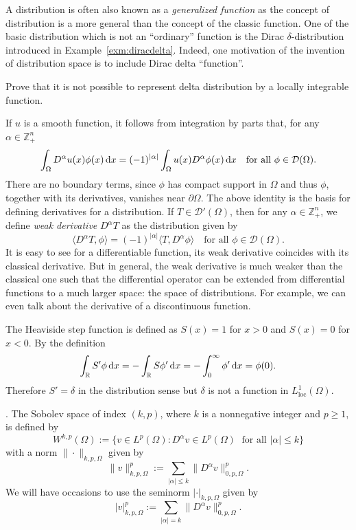 A distribution is often also known as a {\it generalized function} as the concept of distribution
is a more general than the concept of the classic function. One of the basic distribution
which is not an ``ordinary'' function is the Dirac $\delta$-distribution introduced in Example~\ref{exm:diracdelta}. Indeed, one motivation of the invention of distribution space is to include Dirac delta
``function''.

\begin{exe}
Prove that it is not possible to represent delta distribution by a locally integrable
function.
\end{exe}

If $u$ is a smooth function, it follows from integration by parts that, for any $\alpha\in\mathbb Z_+^n$
\[
\int_{\Omega}D^{\alpha}u(x)\phi(x)\,{\rm d}x=(-1)^{|\alpha|}\int_{\Omega}u(x)D^{\alpha}\phi(x)\,{\rm d}x\quad\textrm{for all } \phi\in\mathcal D(\Omega).
\]
There are no boundary terms, since $\phi$ has compact support in $\Omega$
 and thus $\phi$, together with
its derivatives, vanishes near $\partial\Omega$. The above identity is the basis for defining derivatives
for a distribution. If $T\in\mathcal D'(\Omega)$, then for any $\alpha\in\mathbb Z_+^n$, we define {\it weak derivative} $D^{\alpha}T$ as
the distribution given by
\[
\langle D^{\alpha}T, \phi\rangle=(-1)^{|\alpha|}\langle T, D^{\alpha}\phi\rangle\quad\textrm{for all } \phi\in\mathcal D(\Omega).
\]
It is easy to see for a differentiable function, its weak derivative coincides with its classical
derivative. But in general, the weak derivative is much weaker than the classical one such
that the differential operator can be extended from differential functions to a much larger
space: the space of distributions. For example, we can even talk about the derivative of a
discontinuous function.

\begin{example}
The Heaviside step function is defined as $S(x) = 1$ for $x > 0$ and $S(x) = 0$
for $x < 0$. By the definition
\[
\int_{\mathbb R}S'\phi\,{\rm d}x=-\int_{\mathbb R}S\phi'\,{\rm d}x=-\int_0^{\infty}\phi'\,{\rm d}x=\phi(0).
\]
Therefore $S'=\delta$ in the distribution sense but \textcolor[rgb]{1.00,0.00,0.00}{$\delta$ is not a function in $L_{\textrm{loc}}^1(\Omega)$}.
\end{example}

\vskip0.5cm.
The Sobolev space of index $(k, p)$, where $k$ is a nonnegative
integer and $p\geq1$, is defined by
\[
W^{k,p}(\Omega):=\{v\in L^p(\Omega): D^{\alpha}v\in L^p(\Omega)\;\textrm{  for all } |\alpha|\leq k\}
\]
with a norm $\|\cdot\|_{k,p,\Omega}$
 given by
\[
\|v\|_{k,p,\Omega}^p:=\sum_{|\alpha|\leq k}\|D^{\alpha}v\|_{0,p,\Omega}^p.
\]
We will have occasions to use the seminorm $|\cdot|_{k,p,\Omega}$
 given by
\[
|v|_{k,p,\Omega}^p:=\sum_{|\alpha|= k}\|D^{\alpha}v\|_{0,p,\Omega}^p.
\]

